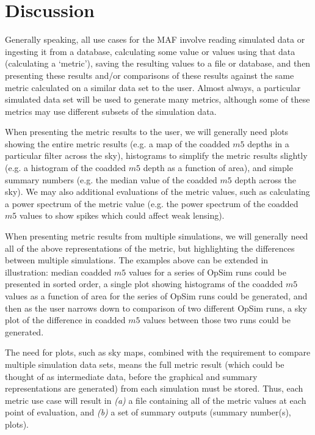 \documentclass[11pt, preprint]{aastex}
\begin{document}
\section{Discussion}

Generally speaking, all use cases for the MAF involve reading
simulated data or ingesting it from a database, calculating some value
or values using that data (calculating a `metric'), saving the
resulting values to a file or database, and then presenting these
results and/or comparisons of these results against the same metric
calculated on a similar data set to the user. Almost always, a
particular simulated data set will be used to generate many metrics,
although some of these metrics may use different subsets of the
simulation data.

When presenting the metric results to the user, we will generally need
plots showing the entire metric results (e.g. a map of the coadded
$m5$ depths in a particular filter across the sky), histograms to
simplify the metric results slightly (e.g. a histogram of the coadded
$m5$ depth as a function of area), and simple summary numbers
(e.g. the median value of the coadded $m5$ depth across the sky). We
may also additional evaluations of the metric values, such as
calculating a power spectrum of the metric value (e.g. the power
spectrum of the coadded $m5$ values to show spikes which could affect
weak lensing).

When presenting metric results from multiple simulations, we will
generally need all of the above representations of the metric, but
highlighting the differences between multiple simulations. The
examples above can be extended in illustration: median coadded $m5$
values for a series of OpSim runs could be presented in sorted order,
a single plot showing histograms of the coadded $m5$ values as a
function of area for the series of OpSim runs could be generated, and
then as the user narrows down to comparison of two different OpSim
runs, a sky plot of the difference in coadded $m5$ values between
those two runs could be generated.

The need for plots, such as sky maps, combined with the requirement to
compare multiple simulation data sets, means the full metric result
(which could be thought of as intermediate data, before the graphical
and summary representations are generated) from each simulation must
be stored. Thus, each metric use case will result in {\it(a)} a file
containing all of the metric values at each point of evaluation, and
{\it(b)} a set of summary outputs (summary number(s), plots).
\end{document}
